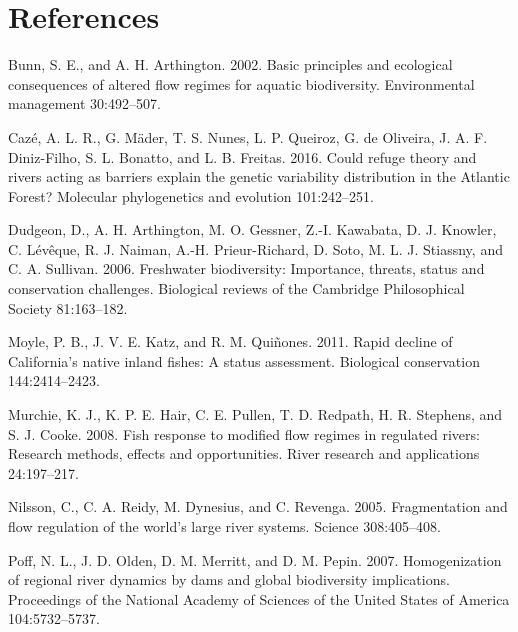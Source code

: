 \documentclass[twoside,12pt,final]{ucthesis-CA2012}
\begin{document}
\begin{ucmainmatter}
\hypertarget{references}{%
\chapter*{References}\label{references}}


\noindent

\setlength{\parindent}{-0.20in}
\setlength{\leftskip}{0.20in}
\setlength{\parskip}{8pt}

\hypertarget{refs}{}
\leavevmode\hypertarget{ref-bunn_basic_2002}{}%
Bunn, S. E., and A. H. Arthington. 2002. Basic principles and ecological
consequences of altered flow regimes for aquatic biodiversity.
Environmental management 30:492--507.

\leavevmode\hypertarget{ref-caze_could_2016}{}%
Cazé, A. L. R., G. Mäder, T. S. Nunes, L. P. Queiroz, G. de Oliveira, J.
A. F. Diniz-Filho, S. L. Bonatto, and L. B. Freitas. 2016. Could refuge
theory and rivers acting as barriers explain the genetic variability
distribution in the Atlantic Forest? Molecular phylogenetics and
evolution 101:242--251.

\leavevmode\hypertarget{ref-dudgeon_freshwater_2006}{}%
Dudgeon, D., A. H. Arthington, M. O. Gessner, Z.-I. Kawabata, D. J.
Knowler, C. Lévêque, R. J. Naiman, A.-H. Prieur-Richard, D. Soto, M. L.
J. Stiassny, and C. A. Sullivan. 2006. Freshwater biodiversity:
Importance, threats, status and conservation challenges. Biological
reviews of the Cambridge Philosophical Society 81:163--182.

\leavevmode\hypertarget{ref-moyle_rapid_2011}{}%
Moyle, P. B., J. V. E. Katz, and R. M. Quiñones. 2011. Rapid decline of
California's native inland fishes: A status assessment. Biological
conservation 144:2414--2423.

\leavevmode\hypertarget{ref-murchie_fish_2008}{}%
Murchie, K. J., K. P. E. Hair, C. E. Pullen, T. D. Redpath, H. R.
Stephens, and S. J. Cooke. 2008. Fish response to modified flow regimes
in regulated rivers: Research methods, effects and opportunities. River
research and applications 24:197--217.

\leavevmode\hypertarget{ref-nilsson_fragmentation_2005}{}%
Nilsson, C., C. A. Reidy, M. Dynesius, and C. Revenga. 2005.
Fragmentation and flow regulation of the world's large river systems.
Science 308:405--408.

\leavevmode\hypertarget{ref-poff_homogenization_2007}{}%
Poff, N. L., J. D. Olden, D. M. Merritt, and D. M. Pepin. 2007.
Homogenization of regional river dynamics by dams and global
biodiversity implications. Proceedings of the National Academy of
Sciences of the United States of America 104:5732--5737.


\end{ucmainmatter}
\end{document}
